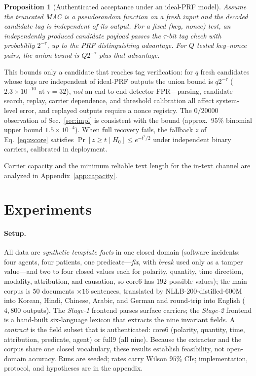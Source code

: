 \documentclass[11pt]{article}
\newtheorem{proposition}{Proposition}
\begin{document}
\begin{proposition}[Authenticated acceptance under an ideal-PRF model]
\label{thm:fpr}
Assume the truncated MAC is a pseudorandom function on a fresh input and the decoded candidate tag is independent of its output. For a fixed (key, nonce) test, an independently produced candidate payload passes the $\tau$-bit tag check with probability $2^{-\tau}$, up to the PRF distinguishing advantage. For $Q$ tested key--nonce pairs, the union bound is $Q2^{-\tau}$ plus that advantage.
\end{proposition}
This bounds only a candidate that reaches tag verification: for $q$ fresh candidates whose tags are independent of ideal-PRF outputs the union bound is $q2^{-\tau}$ ($2.3\times10^{-10}$ at $\tau{=}32$), \emph{not} an end-to-end detector FPR---parsing, candidate search, replay, carrier dependence, and threshold calibration all affect system-level error, and replayed outputs require a nonce registry. The $0/20000$ observation of Sec.~\ref{sec:impl} is consistent with the bound (approx.\ $95\%$ binomial upper bound $1.5\times10^{-4}$). When full recovery fails, the fallback $z$ of Eq.~\eqref{eq:zscore} satisfies $\Pr[z\ge t\mid H_0]\le e^{-t^2/2}$ under independent binary carriers, calibrated in deployment.

Carrier capacity and the minimum reliable text length for the in-text channel are analyzed in Appendix~\ref{app:capacity}.

\section{Experiments}
\label{sec:experiments}
\paragraph{Setup.} All data are \emph{synthetic template facts} in one closed domain (software incidents: four agents, four patients, one predicate---\emph{fix}, with \emph{break} used only as a tamper value---and two to four closed values each for polarity, quantity, time direction, modality, attribution, and causation, so core6 has $192$ possible values); the main corpus is $50$ documents $\times16$ sentences, translated by NLLB-200-distilled-600M into Korean, Hindi, Chinese, Arabic, and German and round-trip into English ($4{,}800$ outputs). The \emph{Stage-1} frontend parses surface carriers; the \emph{Stage-2} frontend is a hand-built six-language lexicon that extracts the nine invariant fields. A \emph{contract} is the field subset that is authenticated: core6 (polarity, quantity, time, attribution, predicate, agent) or full9 (all nine). Because the extractor and the corpus share one closed vocabulary, these results establish feasibility, not open-domain accuracy. Runs are seeded; rates carry Wilson $95\%$ CIs; implementation, protocol, and hypotheses are in the appendix.
\end{document}
